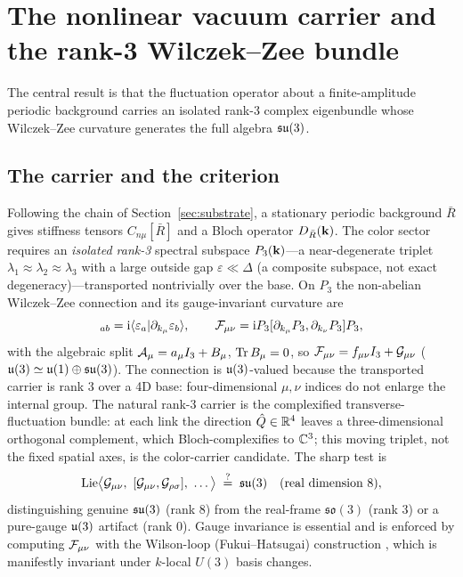 \section{The nonlinear vacuum carrier and the rank-3 Wilczek--Zee bundle}
\label{sec:carrier}

The central result is that the fluctuation operator about a finite-amplitude periodic
background carries an isolated rank-3 complex eigenbundle whose Wilczek--Zee curvature
generates the full algebra $\mathfrak{su}(3)$.

\subsection{The carrier and the criterion}

Following the chain of Section~\ref{sec:substrate}, a stationary periodic background $\bar R$
gives stiffness tensors $C_{n\mu}[\bar R]$ and a Bloch operator $D_{\bar R}(\mathbf{k})$. The
color sector requires an \emph{isolated rank-3} spectral subspace $P_3(\mathbf{k})$---a
near-degenerate triplet $\lambda_1\approx\lambda_2\approx\lambda_3$ with a large outside gap
$\varepsilon\ll\Delta$ (a composite subspace, not exact degeneracy)---transported nontrivially
over the base. On $P_3$ the non-abelian Wilczek--Zee connection and its gauge-invariant
curvature are
\begin{equation}
  [\Ac_\mu]_{ab}=\ii\langle\varepsilon_a|\partial_{k_\mu}\varepsilon_b\rangle,\qquad
  \Fc_{\mu\nu}=\ii P_3[\partial_{k_\mu}P_3,\partial_{k_\nu}P_3]P_3,
  \label{eq:wz}
\end{equation}
with the algebraic split $\mathcal{A}_\mu=a_\mu I_3+B_\mu$, $\operatorname{Tr} B_\mu=0$, so
$\mathcal{F}_{\mu\nu}=f_{\mu\nu}I_3+\mathcal{G}_{\mu\nu}$ ($\mathfrak{u}(3)\simeq\mathfrak{u}(1)\oplus\mathfrak{su}(3)$). The connection
is $\mathfrak{u}(3)$-valued because the transported carrier is rank $3$ over a 4D base: four-dimensional
$\mu,\nu$ indices do not enlarge the internal group. The natural rank-3 carrier is the
complexified transverse-fluctuation bundle: at each link the direction $\hat{Q}\in\mathbb{R}^4$ leaves a
three-dimensional orthogonal complement, which Bloch-complexifies to $\mathbb{C}^3$; this moving
triplet, not the fixed spatial axes, is the color-carrier candidate. The sharp test is
\begin{equation}
  \Lie\bigl\langle \Gc_{\mu\nu},\ [\Gc_{\mu\nu},\Gc_{\rho\sigma}],\ \dots\bigr\rangle
  \;\stackrel{?}{=}\;\su{3}\quad(\text{real dimension }8),
  \label{eq:criterion}
\end{equation}
distinguishing genuine $\mathfrak{su}(3)$ (rank $8$) from the real-frame $\mathfrak{so}(3)$ (rank $3$)
or a pure-gauge $\mathfrak{u}(3)$ artifact (rank $0$). Gauge invariance is essential and is enforced by
computing $\mathcal{F}_{\mu\nu}$ with the Wilson-loop (Fukui--Hatsugai) construction
\citep{FukuiHatsugai2005}, which is manifestly invariant under $k$-local $U(3)$ basis changes.

